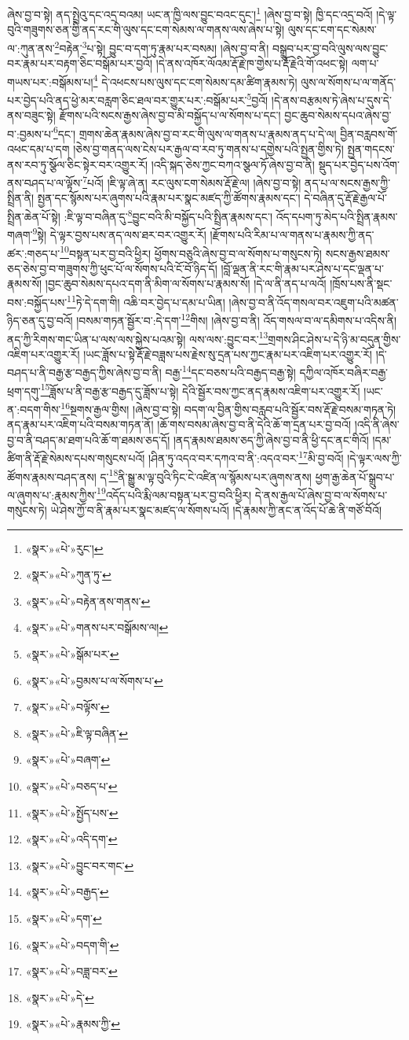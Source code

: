 ཞེས་བྱ་བ་སྟེ། ནད་སྤྲེའུ་དང་འདྲ་བའམ། ཡང་ན་ཁྱི་ལས་བྱུང་བའང་དུང་།\footnote{«སྣར་»«པེ་»རུང་།} །ཞེས་བྱ་བ་སྟེ། ཁྱི་དང་འདྲ་བའོ། །དེ་ལྟ་བུའི་གཟུགས་ཅན་གྱི་ནད་རང་གི་ལུས་དང་ངག་སེམས་ལ་གནས་ལས་ཞེས་པ་སྟེ། ལུས་དང་ངག་དང་སེམས་ལ་:ཀུན་ནས་\footnote{«སྣར་»«པེ་»ཀུན་ཏུ་}བརྟེན་\footnote{«སྣར་»«པེ་»བརྟེན་ནས་གནས་}པ་སྟེ། བྱུང་བ་དག་ཏུ་རྣམ་པར་བསམ། །ཞེས་བྱ་བ་ནི། བསྒྲུབ་པར་བྱ་བའི་ལུས་ལས་བྱུང་བར་རྣམ་པར་བརྟག་ཅིང་བསྒོམ་པར་བྱའོ། །དེ་ནས་འཁོར་ལོའམ་རྡོ་རྗེ་ཁ་གྱེས་པ་རྡོ་རྗེའི་གོ་འཕང་སྟེ། ལག་པ་གཡས་པར་:བསྒོམས་པ།\footnote{«སྣར་»«པེ་»གནས་པར་བསྒོམས་ལ།} དེ་འཕངས་པས་ལུས་དང་ངག་སེམས་དམ་ཚིག་རྣམས་ཏེ། ལུས་ལ་སོགས་པ་ལ་གནོད་པར་བྱེད་པའི་ནད་ཕྱེ་མར་བརླག་ཅིང་ཐལ་བར་གྱུར་པར་:བསྒོམ་པར་\footnote{«སྣར་»«པེ་»སྒོམ་པར་}བྱའོ། །དེ་ནས་བརྩམས་ཏེ་ཞེས་པ་དུས་དེ་ནས་བཟུང་སྟེ། རྫོགས་པའི་སངས་རྒྱས་ཞེས་བྱ་བ་མི་བསྐྱོད་པ་ལ་སོགས་པ་དང་། བྱང་ཆུབ་སེམས་དཔའ་ཞེས་བྱ་བ་:བྱམས་པ་\footnote{«སྣར་»«པེ་»བྱམས་པ་ལ་སོགས་པ་}དང་། གྲགས་ཆེན་རྣམས་ཞེས་བྱ་བ་རང་གི་ལུས་ལ་གནས་པ་རྣམས་ནད་པ་དེ་ལ། བྱིན་བརླབས་གོ་འཕང་དམ་པ་དག །ཅེས་བྱ་གནད་ལས་ངེས་པར་རྒྱལ་བ་རབ་ཏུ་གནས་པ་དགྱེས་པའི་སྤྱན་གྱིས་ཏེ། སྤྱན་གདངས་ནས་རབ་ཏུ་སྩོལ་ཅིང་སྟེར་བར་འགྱུར་རོ། །འདི་སྐད་ཅེས་ཀྱང་བཀའ་སྩལ་ཏོ་ཞེས་བྱ་བ་ནི། སྡུད་པར་བྱེད་པས་འོག་ནས་བཤད་པ་ལ་ལྟོས་\footnote{«སྣར་»«པེ་»བལྟོས་}པའོ། །ཇི་ལྟ་ཞེ་ན། རང་ལུས་ངག་སེམས་རྡོ་རྗེ་ལ། །ཞེས་བྱ་བ་སྟེ། ནད་པ་ལ་སངས་རྒྱས་ཀྱི་སྤྲིན་ནི། སྤྱན་དང་སྙོམས་པར་ཞུགས་པའི་རྣམ་པར་སྣང་མཛད་ཀྱི་ཚོགས་རྣམས་དང་། དེ་བཞིན་དུ་རྡོ་རྗེ་རྒྱལ་པོ་སྤྲིན་ཆེན་པོ་སྟེ། :ཇི་ལྟ་བ་བཞིན་དུ་\footnote{«སྣར་»«པེ་»ཇི་ལྟ་བཞིན་}བྱུང་བའི་མི་བསྐྱོད་པའི་སྤྲིན་རྣམས་དང་། འོད་དཔག་ཏུ་མེད་པའི་སྤྲིན་རྣམས་གཞག་\footnote{«སྣར་»«པེ་»བཞག་}སྟེ། དེ་ལྟར་བྱས་པས་ནད་ལས་ཐར་བར་འགྱུར་རོ། །རྫོགས་པའི་རིམ་པ་ལ་གནས་པ་རྣམས་ཀྱི་ནད་ཚར་:གཅད་པ་\footnote{«སྣར་»«པེ་»བཅད་པ་}བསྟན་པར་བྱ་བའི་ཕྱིར། ཕྱོགས་བཅུའི་ཞེས་བྱ་བ་ལ་སོགས་པ་གསུངས་ཏེ། སངས་རྒྱས་ཐམས་ཅད་ཅེས་བྱ་བ་གཟུགས་ཀྱི་ཕུང་པོ་ལ་སོགས་པའི་ངོ་བོ་ཉིད་དོ། །བློ་ལྡན་ནི་རང་གི་རྣམ་པར་ཤེས་པ་དང་ལྡན་པ་རྣམས་སོ། །བྱང་ཆུབ་སེམས་དཔའ་དག་ནི་མིག་ལ་སོགས་པ་རྣམས་སོ། །དེ་ལ་ནི་ནད་པ་ལའོ། །ཁྲོས་པས་ནི་སྡང་བས་:བསྐྱོད་པས་\footnote{«སྣར་»«པེ་»སྤྱོད་པས་}ཏེ་དེ་དག་གི། འཆི་བར་བྱེད་པ་དམ་པ་ཡིན། །ཞེས་བྱ་བ་ནི་འོད་གསལ་བར་འཇུག་པའི་མཚན་ཉིད་ཅན་དུ་བྱ་བའོ། །བསམ་གཏན་སྦྱོར་བ་:དེ་དག་\footnote{«སྣར་»«པེ་»འདི་དག་}གིས། །ཞེས་བྱ་བ་ནི། འོད་གསལ་བ་ལ་དམིགས་པ་འདིས་ནི། ནད་ཀྱི་རིགས་གང་ཡིན་པ་ལས་ལས་སྐྱེས་པའམ་སྟེ། ལས་ལས་:བྱུང་བར་\footnote{«སྣར་»«པེ་»བྱུང་བར་གང་}གྲགས་ཤིང་ཤེས་པ་དེ་ཉི་མ་བདུན་གྱིས་འཇིག་པར་འགྱུར་རོ། །ཡང་ཟློས་པ་སྟེ་རྡོ་རྗེ་བཟླས་པས་རྗེས་སུ་དྲན་པས་ཀྱང་རྣམ་པར་འཇིག་པར་འགྱུར་རོ། །དེ་བཤད་པ་ནི་བརྒྱ་རྩ་བརྒྱད་ཀྱིས་ཞེས་བྱ་བ་ནི། བརྒྱ་\footnote{«སྣར་»«པེ་»བརྒྱད་}དང་བཅས་པའི་བརྒྱད་བརྒྱ་སྟེ། དཀྱིལ་འཁོར་བཞིར་བརྒྱ་ཕྲག་དགུ་\footnote{«སྣར་»«པེ་»དག་}ཟློས་པ་ནི་བརྒྱ་རྩ་བརྒྱད་དུ་ཟློས་པ་སྟེ། དེའི་སྦྱོར་བས་ཀྱང་ནད་རྣམས་འཇིག་པར་འགྱུར་རོ། །ཡང་ན་:བདག་གིས་\footnote{«སྣར་»«པེ་»བདག་གི་}སྔགས་རྒྱལ་གྱིས། །ཞེས་བྱ་བ་སྟེ། བདག་ལ་བྱིན་གྱིས་བརླབ་པའི་སྦྱོར་བས་རྡོ་རྗེ་བསམ་གཏན་ཏེ། ནད་རྣམ་པར་འཇིག་པའི་བསམ་གཏན་ནོ། །ཆོ་གས་བསམ་ཞེས་བྱ་བ་ནི་དེའི་ཆོ་ག་དྲན་པར་བྱ་བའོ། །འདི་ནི་ཞེས་བྱ་བ་ནི་བཤད་མ་ཐག་པའི་ཆོ་ག་ཐམས་ཅད་དོ། །ནད་རྣམས་ཐམས་ཅད་ཀྱི་ཞེས་བྱ་བ་ནི་ཕྱི་དང་ནང་གིའོ། །དམ་ཚིག་ནི་རྡོ་རྗེ་སེམས་དཔས་གསུངས་པའོ། །ཤིན་ཏུ་འདའ་བར་དཀའ་བ་ནི་:འདའ་བར་\footnote{«སྣར་»«པེ་»བཟླ་བར་}མི་བྱ་བའོ། །དེ་ལྟར་ལས་ཀྱི་ཚོགས་རྣམས་བཤད་ནས། ད་\footnote{«སྣར་»«པེ་»དེ་}ནི་སྒྱུ་མ་ལྟ་བུའི་ཏིང་ངེ་འཛིན་ལ་སྙོམས་པར་ཞུགས་ནས། ཕྱག་རྒྱ་ཆེན་པོ་སྒྲུབ་པ་ལ་ཞུགས་པ་:རྣམས་ཀྱིས་\footnote{«སྣར་»«པེ་»རྣམས་ཀྱི་}འདོད་པའི་རྨི་ལམ་བསྟན་པར་བྱ་བའི་ཕྱིར། དེ་ནས་རྒྱལ་པོ་ཞེས་བྱ་བ་ལ་སོགས་པ་གསུངས་ཏེ། ཡེ་ཤེས་ཀྱོ་བ་ནི་རྣམ་པར་སྣང་མཛད་ལ་སོགས་པའོ། །དེ་རྣམས་ཀྱི་ནང་ན་འོད་པོ་ཆེ་ནི་གཙོ་བོའོ། 
